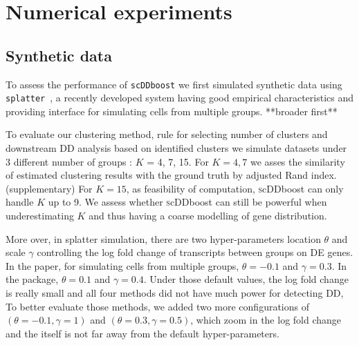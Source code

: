 \documentclass[aoas,preprint]{imsart}
\newtheorem{theorem}{Theorem}
\begin{document}
%


 
\section{Numerical experiments}

\subsection{Synthetic data} 

To assess the performance of \verb+scDDboost+ we first  simulated
synthetic data using \verb+splatter+~\citep{ref:Zappia}, 
a recently developed system having good empirical characteristics 
and providing interface for simulating cells from multiple groups. **broader first**

To evaluate our clustering method, rule for selecting number of clusters and downstream DD analysis based on identified clusters we simulate datasets under 3 different number of groups : $K$ =  4, 7, 15.  For $K = 4, 7$ we asses 
the similarity of estimated clustering results with the ground truth by adjusted Rand index. (supplementary)  For $K = 15$, as feasibility of computation, \textsc scDDboost can only handle $K$ up to 9. We assess whether \textsc scDDboost 
can still be powerful when underestimating $K$ and thus having a coarse modelling of gene distribution.

More over, in splatter simulation, there are two hyper-parameters location $\theta$ and scale $\gamma$ controlling the log fold change of transcripts between groups on DE genes. In the paper, for simulating cells from multiple groups, $\theta = -0.1$ and $\gamma = 0.3$. 
In the package, $\theta = 0.1$ and $\gamma = 0.4$. Under those default values, the log fold change is really small and all four methods did not have much power for detecting DD, To better evaluate those methods, we added two more configurations of $(\theta = -0.1, \gamma = 1)$ and $(\theta = 0.3, \gamma = 0.5)$, which zoom in the log fold change and the itself is not far away from the default hyper-parameters. 
\end{document}

